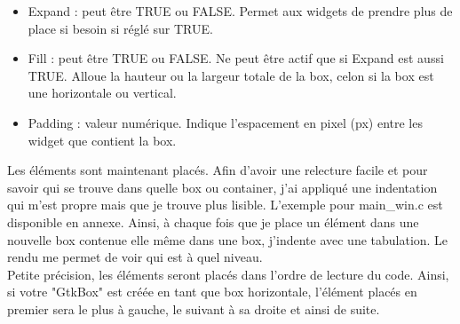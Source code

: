 \documentclass[11pt,french,a4paper]{report}
\begin{document}
\begin{itemize}
    \item Expand : peut être TRUE ou FALSE. Permet aux widgets de prendre plus de place si besoin si réglé sur TRUE. 
    \item Fill : peut être TRUE ou FALSE. Ne peut être actif que si Expand est aussi TRUE. Alloue la hauteur ou la largeur totale
        de la box, 
        celon si la box est une horizontale ou vertical.
    \item Padding : valeur numérique. Indique l'espacement en pixel (px) entre les widget que contient la box. 
\end{itemize}
Les éléments sont maintenant placés. Afin d'avoir une relecture facile et pour savoir qui se trouve dans quelle box ou container, 
j'ai appliqué une indentation  qui m'est propre mais que je trouve plus lisible. L'exemple pour main\_win.c est disponible en annexe. 
Ainsi, à chaque fois que je place un élément dans une nouvelle box contenue elle même dans une box, j'indente avec une 
tabulation. Le rendu me permet de voir qui est à quel niveau. \\
Petite précision, les éléments seront placés dans l'ordre de lecture du code. Ainsi, si votre "GtkBox" est créée en tant
que box horizontale, l'élément placés en premier sera le plus à gauche, le suivant à sa droite et ainsi de suite. \\ 
\end{document}
